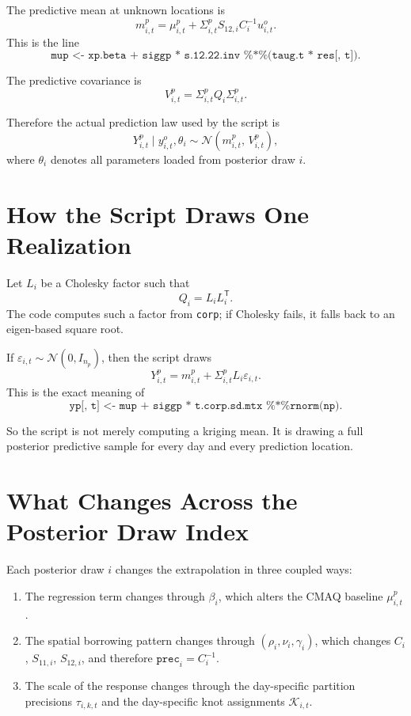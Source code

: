 \documentclass[11pt]{article}
\newcommand{\trans}{\mathsf{T}}
\begin{document}
The predictive mean at unknown locations is
\[
m^p_{i,t}
=
\mu^p_{i,t}
+
\Sigma^p_{i,t} S_{12,i} C_i^{-1} u^o_{i,t}.
\]
This is the line
\[
\texttt{mup <- xp.beta + siggp * s.12.22.inv \%*\% (taug.t * res[, t])}.
\]

The predictive covariance is
\[
V^p_{i,t}
=
\Sigma^p_{i,t} Q_i \Sigma^p_{i,t}.
\]

Therefore the actual prediction law used by the script is
\[
Y^p_{i,t} \mid y^o_{i,t}, \theta_i
\sim
\mathcal{N}\!\left(m^p_{i,t},\, V^p_{i,t}\right),
\]
where \(\theta_i\) denotes all parameters loaded from posterior draw \(i\).

\section{How the Script Draws One Realization}

Let \(L_i\) be a Cholesky factor such that
\[
Q_i = L_i L_i^\trans.
\]
The code computes such a factor from \texttt{corp}; if Cholesky fails, it falls
back to an eigen-based square root.

If \(\varepsilon_{i,t} \sim \mathcal{N}(0, I_{n_p})\), then the script draws
\[
Y^p_{i,t}
=
m^p_{i,t}
+
\Sigma^p_{i,t} L_i \varepsilon_{i,t}.
\]
This is the exact meaning of
\[
\texttt{yp[, t] <- mup + siggp * t.corp.sd.mtx \%*\% rnorm(np)}.
\]

So the script is not merely computing a kriging mean. It is drawing a full
posterior predictive sample for every day and every prediction location.

\section{What Changes Across the Posterior Draw Index}

Each posterior draw \(i\) changes the extrapolation in three coupled ways:
\begin{enumerate}
\item The regression term changes through \(\beta_i\), which alters the CMAQ
baseline \(\mu^p_{i,t}\).
\item The spatial borrowing pattern changes through
\((\rho_i,\nu_i,\gamma_i)\), which changes \(C_i\), \(S_{11,i}\), \(S_{12,i}\),
and therefore \(\texttt{prec}_i = C_i^{-1}\).
\item The scale of the response changes through the day-specific partition
precisions \(\tau_{i,k,t}\) and the day-specific knot assignments
\(\mathcal{K}_{i,t}\).
\end{enumerate}
\end{document}
